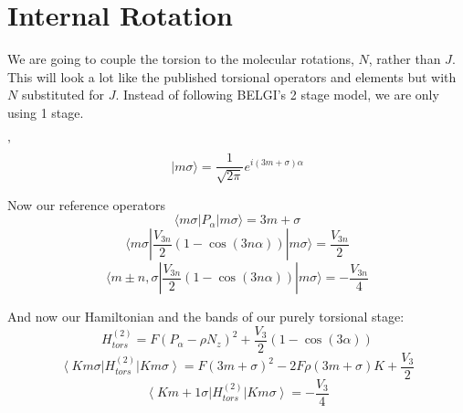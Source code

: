 \documentclass{article}
\begin{document}
\section{Internal Rotation}
We are going to couple the torsion to the molecular rotations, $N$, rather than $J$. This will look a lot like the published torsional operators and elements but with $N$ substituted for $J$. Instead of following BELGI's 2 stage model, we are only using 1 stage.

'\begin{equation}
|m\sigma\rangle = \frac{1}{\sqrt{2\pi}}e^{i(3m+\sigma)\alpha}
\end{equation}

Now our reference operators
\begin{equation}
\langle m \sigma |P_{\alpha}|m\sigma\rangle = 3m+\sigma
\end{equation}
\begin{equation}
\langle m \sigma |\frac{V_{3n}}{2}(1-\cos (3n\alpha))| m\sigma\rangle = \frac{V_{3n}}{2}
\end{equation}
\begin{equation}
\langle m\pm n, \sigma | \frac{V_{3n}}{2}(1-\cos (3n\alpha))| m\sigma\rangle = -\frac{V_{3n}}{4}
\end{equation}

And now our Hamiltonian and the bands of our purely torsional stage:
\begin{equation}
H_{tors}^{(2)} = F(P_{\alpha}-\rho N_{z})^{2} + \frac{V_{3}}{2}(1-\cos (3\alpha))
\end{equation}
\begin{equation}
\left\langle K m\sigma\right|H_{tors}^{(2)}\left|K m\sigma\right\rangle = F(3m+\sigma)^{2} - 2F\rho(3m+\sigma)K +\frac{V_{3}}{2}
\end{equation}
\begin{equation}
\left\langle K m+1\sigma\right|H_{tors}^{(2)}\left|K m\sigma\right\rangle = -\frac{V_{3}}{4}
\end{equation}
\end{document}
